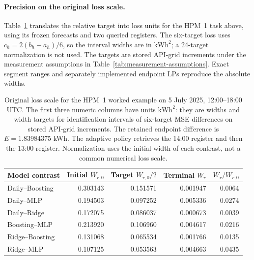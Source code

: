 \documentclass[12pt]{article}
\begin{document}
\paragraph{Precision on the original loss scale.}
Table~\ref{tab:absolute_joint_widths} translates the relative target into
loss units for the HPM~1 task above, using its frozen forecasts and two queried
registers. The six-target loss uses $c_h=2(b_h-a_h)/6$, so the interval widths
are in $\mathrm{kWh}^2$; a 24-target normalization is not used. The targets
are stored API-grid increments under the measurement assumptions in
Table~\ref{tab:measurement-assumptions}. Exact segment ranges and separately
implemented endpoint LPs reproduce the absolute widths.
\begin{table}[htbp]
\centering\small
\begin{tabular}{lrrrr}
\toprule
Model contrast & Initial $W_{r,0}$ & Target $W_{r,0}/2$ & Terminal $W_r$ & $W_r/W_{r,0}$\\
\midrule
Daily--Boosting & 0.303143 & 0.151571 & 0.001947 & 0.0064\\
Daily--MLP & 0.194503 & 0.097252 & 0.005336 & 0.0274\\
Daily--Ridge & 0.172075 & 0.086037 & 0.000673 & 0.0039\\
Boosting--MLP & 0.213920 & 0.106960 & 0.004617 & 0.0216\\
Ridge--Boosting & 0.131068 & 0.065534 & 0.001766 & 0.0135\\
Ridge--MLP & 0.107125 & 0.053563 & 0.004663 & 0.0435\\
\bottomrule
\end{tabular}
\caption{Original loss scale for the HPM~1 worked example on 5 July 2025, 12:00--18:00 UTC. The first three numeric columns have units $\mathrm{kWh}^2$: they are widths and width targets for identification intervals of six-target MSE differences on stored API-grid increments. The retained endpoint difference is $E=1.83984375$ kWh. The adaptive policy retrieves the 14:00 register and then the 13:00 register. Normalization uses the initial width of each contrast, not a common numerical loss scale.}
\label{tab:absolute_joint_widths}
\end{table}
\end{document}
